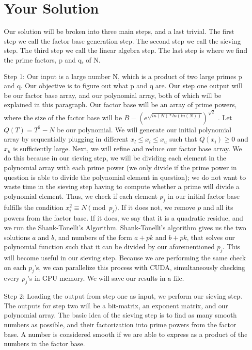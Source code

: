 \documentclass[11pt,twocolumn]{article}
\begin{document}
\section {Your Solution}\label{soln}
Our solution will be broken into three main steps, and a last trivial. The first step we call the factor base generation step. The second step we call the sieving step. The third step we call the linear algebra step. The last step is where we find the prime factors, p and q, of N.

Step 1: Our input is a large number N, which is a product of two large primes p and q. Our objective is to figure out what p and q are. Our step one output will be our factor base array, and our polynomial array, both of which will be explained in this paragraph. Our factor base will be an array of prime powers, where the size of the factor base will be $B = (e^{\sqrt{ln(N)*ln(ln(N))}})^{\sqrt{2}}$ \cite{hoffstein:cryptography}.
Let $Q(T) = T^2 - N$ be our polynomial. We will generate our initial polynomial array by sequentially plugging in different $x_l \leq x_i \leq x_u$ such that $Q(x_i) \geq 0$ and $x_u$ is sufficiently large. Next, we will refine and
reduce our factor base array. We do this because in our sieving step, we will be dividing each element in the polynomial array with each prime power (we only divide if the prime power in question is able to divide the polynomial element in question); we do not want to waste time in the sieving step having to compute  whether a prime will divide a polynomial element. Thus, we check if each element $p_j$ in our initial factor base fulfills the condition $x_i^2 \equiv N \pmod{p_j}$. If it does not, we remove $p$ and all its powers from the factor base. If it does, we say that it is a quadratic residue, and we run the Shank-Tonelli's Algorithm. Shank-Tonelli's algorithm gives us the two solutions $a$ and $b$, and numbers of the form $a+pk$ and $b+pk$, that solves our polynomial function such that it can be divided by our aforementioned $p_j$. This will become useful in our sieving step. Because we are performing the same check on each $p_j$'s, we can parallelize this process with CUDA, simultaneously checking every $p_j$'s in GPU memory. We will save our results in a file.


Step 2: Loading the output from step one as input, we perform our sieving step. The outputs for step two will be a bit-matrix, an exponent matrix, and our polynomial array. The basic idea of the sieving step is to find as many smooth numbers as possible, and their factorization into prime powers from the factor base. A number is considered smooth if we are able to express as a product of the numbers in the factor base.
\end{document}
